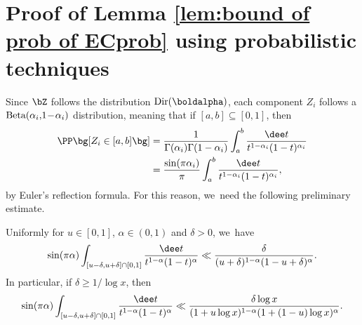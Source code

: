 \section{Proof of Lemma \ref{lem:bound of prob of ECprob} using probabilistic techniques}\label{sec:boundary event Prob}

Since $\bZ$ follows the distribution $\text{Dir}(\boldalpha)$, each component $Z_i$ follows a \hbox{$\text{Beta}(\alpha_i,\mkern-3mu 1 \!-\! \alpha_i)$} distribution, meaning that if $[a,b]\subseteq[0,1]$, then
\begin{equation}
\label{eq:Zi distribution}
\begin{aligned}
\PP\bg[Z_i\in[a,b] \bg] &= \frac{1}{\Gamma(\alpha_i)\Gamma(1-\alpha_i)}\int_a^b \frac{\dee t}{t^{1-\alpha_i} (1-t)^{\alpha_i}}\\
&= \frac{\sin(\pi\alpha_i)}{\pi} \int_a^b \frac{\dee t}{t^{1-\alpha_i} (1-t)^{\alpha_i}},
\end{aligned}
\end{equation}
by Euler's reflection formula. For this reason, we~need the following preliminary estimate.

\begin{lem}\label{lem:beta estimate}
Uniformly for $u\in[0,1]$, $\alpha \in (0, 1)$ and $\delta > 0$, we~have
\[
\sin(\pi\alpha) \int_{[u-\delta,u+\delta]\cap[0,1]} \frac{\dee t}{t^{1-\alpha}(1-t)^\alpha} \ll \frac{\delta}{(u+\delta)^{1-\alpha}(1-u+\delta)^\alpha}.
\]
In particular, if $\delta\ge1/\log x$, then
\[
\sin(\pi\alpha) \int_{[u-\delta,u+\delta]\cap[0,1]} \frac{\dee t}{t^{1-\alpha}(1-t)^\alpha} \ll \frac{\delta\log x}{(1+u\log x)^{1-\alpha}(1+(1-u)\log x)^\alpha}.
\]
\end{lem}

